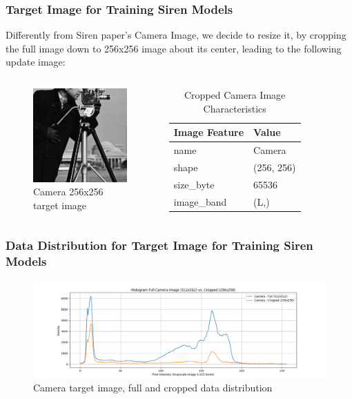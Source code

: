



\begin{frame}
\frametitle{Target Image for Training Siren Models}
Differently from Siren paper's Camera Image, we decide to resize it, by cropping the full image down to 256x256 image about its center, leading to the following update image:


\begin{columns}
\begin{figure}
\includegraphics[scale=0.2]{slides/experiments/target-image/cropped_cameramen_256x256.png}
\caption{Camera 256x256 target image}
\end{figure}

\begin{table}
\begin{tabular}{ll}
\hline
          Image Feature & Value \\
\hline
       name &      Camera \\
      shape &  (256, 256) \\
  size\_byte &       65536 \\
 image\_band &        (L,) \\
\hline
\end{tabular}
\caption{Cropped Camera Image Characteristics }
\end{table}

\end{columns}
\end{frame}

\begin{frame}
\frametitle{Data Distribution for Target Image for Training Siren Models}

\begin{figure}
\includegraphics[scale=0.2]{slides/experiments/target-image/mixing_image_hist.png}
\caption{Camera target image, full and cropped data distribution}
\end{figure}

\end{frame}


